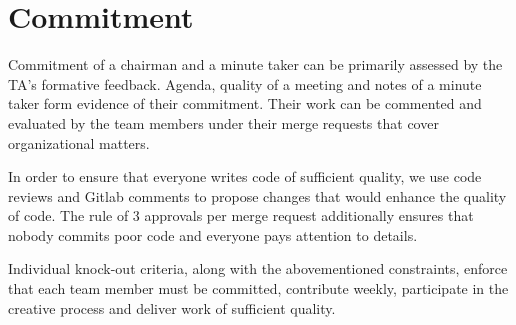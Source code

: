 \section{Commitment}

Commitment of a chairman and a minute taker can be primarily assessed by the TA's formative feedback. Agenda, quality of a meeting and notes of a minute taker form evidence of their commitment. Their work can be commented and evaluated by the team members under their merge requests that cover organizational matters.

In order to ensure that everyone writes code of sufficient quality, we use code reviews and Gitlab comments to propose changes that would enhance the quality of code. The rule of 3 approvals per merge request additionally ensures that nobody commits poor code and everyone pays attention to details.

Individual knock-out criteria, along with the abovementioned constraints, enforce that each team member must be committed, contribute weekly, participate in the creative process and deliver work of sufficient quality.